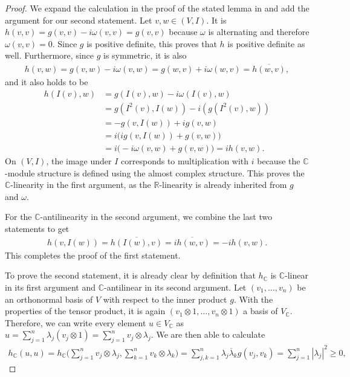 \begin{proof}
	We expand the calculation in the proof of the stated lemma in \cite{Huybrechts2004} and add the
	argument for our second statement. Let 
	$v,w \in (V,I)$. It is $h(v,v) = g(v,v) - i \omega(v,v) =g(v,v)$ because $\omega$ is alternating and 
	therefore $\omega(v,v) = 0$. Since $g$ is positive definite, this proves that $h$ is positive definite 
	as well. Furthermore, since $g$ is symmetric, it is also
	\begin{align*}
		h(v,w) = g(v,w) - i\omega(v,w) = g(w,v) + i\omega(w,v) = \overline{h(w,v)},
	\end{align*}
	and it also holds to be
	\begin{align*}
		h(I(v),w) &= g(I(v),w) - i\omega(I(v),w) \\&= g(I^2(v),I(w)) -i (g(I^2(v),w)) \\&= -g(v,I(w)) +
		ig(v,w) \\&= i\big(i g(v,I(w)) + g(v,w)\big) \\&= i\big(- i\omega(v,w) + g(v,w)\big) = i h(v,w).
	\end{align*}
	On $(V,I)$, the image under $I$ corresponds to multiplication with $i$ because the
	$\mathbb{C}$-module structure is defined using the almost complex structure. This proves the 
	$\mathbb{C}$-linearity in the first	argument, as the $\mathbb{R}$-linearity is already inherited from 
	$g$ and $\omega$.
	
	For the $\mathbb{C}$-antilinearity in the second argument, we combine the last two statements to
	get
	\begin{align*}
		h(v,I(w)) = \overline{h(I(w),v)} = \overline{ih(w,v)} = -ih(v,w).
	\end{align*} This completes the proof of the first statement. 
	
	To prove the second statement, it is already clear by definition that $h_\mathbb{C}$ is 
	$\mathbb{C}$-linear in its first argument and $\mathbb{C}$-antilinear in its second argument. Let 
	$(v_1,\dots,v_n)$ be an orthonormal basis of $V$ with respect to the inner product $g$. With the 
	properties of the tensor product, it is again $(v_1 \otimes 1, \dots, v_n \otimes 1)$ a basis of 
	$V_\mathbb{C}$. Therefore, we can write every element $u \in V_\mathbb{C}$ as
	$u = \sum_{j=1}^{n} \lambda_j(v_j \otimes 1)= \sum_{j=1}^{n} v_j \otimes \lambda_j$. We are then
	able to calculate
	\begin{align*}
		h_\mathbb{C}(u,u) = h_\mathbb{C}\Big(\sum_{j=1}^n v_j \otimes \lambda_j, \sum_{k=1}^n v_k \otimes
		\lambda_k\Big) = \sum_{j,k=1}^{n} \lambda_j\overline\lambda_k g(v_j,v_k) = \sum_{j=1}^n|\lambda_j|^2
		\geq 0,
	\end{align*}
	

\end{proof}
